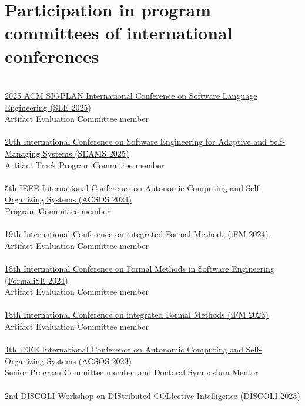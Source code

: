 \section{{\color{black}Participation in program committees of international conferences}}
\halfblankline \\
\href{https://conf.researchr.org/home/sle-2025}{2025 ACM SIGPLAN International Conference on Software Language Engineering (SLE 2025)}
\\ Artifact Evaluation Committee member \\
\halfblankline \\
\href{https://conf.researchr.org/home/seams-2025}{20th International Conference on Software Engineering for Adaptive and Self-Managing Systems (SEAMS 2025)}
\\ Artifact Track Program Committee member \\
\halfblankline \\
\href{https://2024.acsos.org/}{5th IEEE International Conference on Autonomic Computing and Self-Organizing Systems (ACSOS 2024)}
\\ Program Committee member \\
\halfblankline \\
\href{https://ifm2024.cs.manchester.ac.uk/}{19th International Conference on integrated Formal Methods
(iFM 2024)}
\\ Artifact Evaluation Committee member \\
\halfblankline \\
\href{https://formalise2024.github.io/}{18th International Conference on Formal Methods in Software Engineering (FormaliSE 2024)}
\\ Artifact Evaluation Committee member \\
\halfblankline \\
\href{https://liacs.leidenuniv.nl/~bonsanguemm/ifm23/}{18th International Conference on integrated Formal Methods
(iFM 2023)}
\\ Artifact Evaluation Committee member \\
\halfblankline \\
\href{https://2023.acsos.org/}{4th IEEE International Conference on Autonomic Computing and Self-Organizing Systems (ACSOS 2023)}
\\ Senior Program Committee member and Doctoral Symposium Mentor \\
\halfblankline \\
\href{https://discoli-workshop.github.io/2023/}{2nd DISCOLI Workshop on DIStributed COLlective Intelligence (DISCOLI 2023)}
